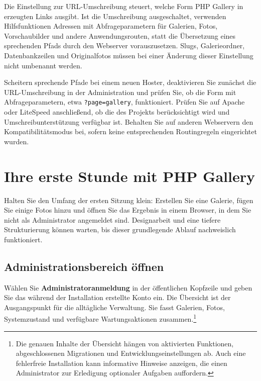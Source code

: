 \documentclass[11pt,a4paper]{article}
\newcommand{\filepath}[1]{\path{#1}}
\newcommand{\ui}[1]{\textbf{#1}}
\newcommand{\codeword}[1]{\nolinkurl{#1}}
\begin{document}
Die Einstellung zur URL-Umschreibung steuert, welche Form PHP Gallery in
erzeugten Links ausgibt. Ist die Umschreibung ausgeschaltet, verwenden
Hilfsfunktionen Adressen mit Abfrageparametern für Galerien, Fotos,
Vorschaubilder und andere Anwendungsrouten, statt die Übersetzung eines
sprechenden Pfads durch den Webserver vorauszusetzen. Slugs, Galerieordner,
Datenbankzeilen und Originalfotos müssen bei einer Änderung dieser Einstellung
nicht umbenannt werden.

Scheitern sprechende Pfade bei einem neuen Hoster, deaktivieren Sie zunächst die
URL-Umschreibung in der Administration und prüfen Sie, ob die Form mit
Abfrageparametern, etwa \codeword{?page=gallery}, funktioniert. Prüfen Sie auf
Apache oder LiteSpeed anschließend, ob die \filepath{.htaccess} des Projekts
berücksichtigt wird und Umschreibunterstützung verfügbar ist. Behalten Sie auf
anderen Webservern den Kompatibilitätsmodus bei, sofern keine entsprechenden
Routingregeln eingerichtet wurden.

\section{Ihre erste Stunde mit PHP Gallery}
\label{sec:first-hour}

Halten Sie den Umfang der ersten Sitzung klein: Erstellen Sie eine Galerie,
fügen Sie einige Fotos hinzu und öffnen Sie das Ergebnis in einem Browser, in
dem Sie nicht als Administrator angemeldet sind. Designarbeit und eine tiefere
Strukturierung können warten, bis dieser grundlegende Ablauf nachweislich
funktioniert.

\subsection{Administrationsbereich öffnen}

Wählen Sie \ui{Administratoranmeldung} in der öffentlichen Kopfzeile und geben
Sie das während der Installation erstellte Konto ein. Die Übersicht ist der
Ausgangspunkt für die alltägliche Verwaltung. Sie fasst Galerien, Fotos,
Systemzustand und verfügbare Wartungsaktionen zusammen.\footnote{Die genauen
Inhalte der Übersicht hängen von aktivierten Funktionen, abgeschlossenen
Migrationen und Entwicklungseinstellungen ab. Auch eine fehlerfreie Installation
kann informative Hinweise anzeigen, die einen Administrator zur Erledigung
optionaler Aufgaben auffordern.}
\end{document}
